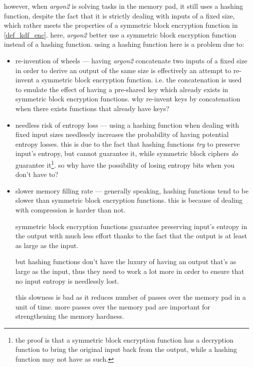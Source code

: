 \documentclass[twocolumn]{article}
\begin{document}
however, when \emph{argon2} is solving tasks in the memory pad, it still
uses a hashing function, despite the fact that it is strictly dealing with
inputs of a fixed size, which rather meets the properties of a symmetric
block encryption function in \cref{def_kdf_enc}.  here, \emph{argon2}
better use a symmetric block encryption function instead of a hashing
function.  using a hashing function here is a problem due to:
\begin{itemize}
    \item re-invention of wheels --- having \emph{argon2} concatenate two
    inputs of a fixed size in order to derive an output of the same size is
    effectively an attempt to re-invent a symmetric block encryption
    function.  i.e. the concatenation is used to emulate the effect of
    having a pre-shared key which already exists in symmetric block
    encryption functions.  why re-invent keys by concatenation when there
    exists functions that already have keys?

    \item needless risk of entropy loss --- using a hashing function when
    dealing with fixed input sizes needlessly increases the probability of
    having potential entropy losses.  this is due to the fact that hashing
    functions \emph{try} to preserve input's entropy, but cannot guarantee
    it, while symmetric block ciphers \emph{do} guarantee it\footnote{the
    proof is that a symmetric block encryption function has a decryption
    function to bring the original input back from the output, while a
    hashing function may not have as such.}.  so why have the possibility
    of losing entropy bits when you don't have to?

    \item slower memory filling rate --- generally speaking, hashing
    functions tend to be slower than symmetric block encryption functions.
    this is because of dealing with compression is harder than not.

    symmetric block encryption functions guarantee preserving input's
    entropy in the output with much less effort thanks to the fact that the
    output is at least as large as the input.

    but hashing functions don't have the luxury of having an output that's
    as large as the input, thus they need to work a lot more in order to
    ensure that no input entropy is needlessly lost.

    this slowness is bad as it reduces number of passes over the memory pad in
    a unit of time.  more passes over the memory pad are important for
    strengthening the memory hardness.
\end{itemize}
\end{document}
